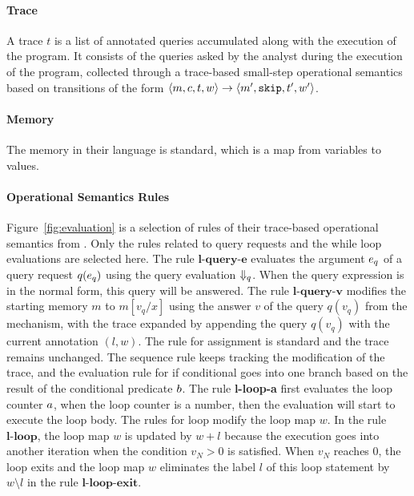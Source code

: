 \paragraph{Trace} 
A trace $t$ is a list of annotated queries accumulated along with the execution of the program. 
  It consists of the queries asked by the analyst during the execution of the program,
collected through
  a trace-based small-step operational semantics based on transitions of the form $ \langle m,c, t, w \rangle \to \langle m', \mathtt{skip}, t', w' \rangle $.
  \paragraph{Memory}
  The memory in their language is standard, which is a map from variables to values.
  \paragraph*{Operational Semantics Rules}
Figure~\ref{fig:evaluation} is a selection of rules of their trace-based operational semantics from .
Only the rules related to query requests and the while loop evaluations are selected here.
The rule $\textbf{l-query-e}$ evaluates the argument $e_q$ of a query request $q(e_q)$ using the query evaluation $\Downarrow_q$.
When the query expression is in the normal form, this query will be answered.
The rule $\textbf{l-query-v}$ modifies the starting memory $m$ to $m[v_q/x]$ using the answer $v$ of the query $q(v_q)$ from the mechanism, with the trace expanded by appending the query $q(v_q)$ with the current annotation $(l,w)$.
The rule for assignment is standard and the trace remains unchanged.
The sequence rule keeps tracking the modification of the trace, and the evaluation rule for if conditional goes into one branch based on the result of the conditional predicate $b$. 
The rule \textbf{l-loop-a} first evaluates the loop counter $a$, when the loop counter is a number, then the evaluation will start to execute the loop body.
The rules for loop modify the loop map $w$. In the rule $\textbf{l-loop}$, the loop map $w$ is updated by $w + l$ because the execution goes into another iteration when the condition $v_N >0$ is satisfied.
When $v_N$ reaches $0$, the loop exits and the loop map $w$ eliminates the label $l$ of this loop statement by $w \setminus l$ in the rule $\textbf{l-loop-exit}$. 
% 
